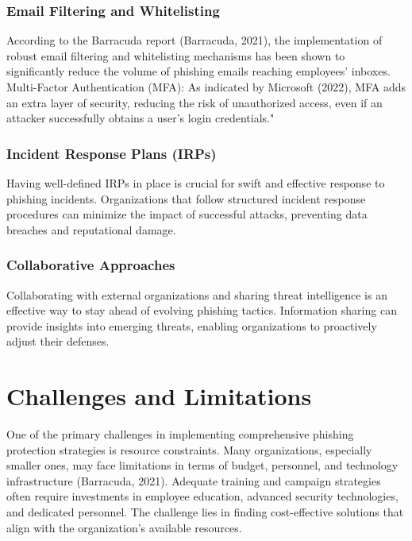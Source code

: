\documentclass[conference]{IEEEtran}
\begin{document}
\subsubsection{Email Filtering and Whitelisting} According to the Barracuda report (Barracuda, 2021), the implementation of robust email filtering and whitelisting mechanisms has been shown to significantly reduce the volume of phishing emails reaching employees' inboxes.
Multi-Factor Authentication (MFA): As indicated by Microsoft (2022), MFA adds an extra layer of security, reducing the risk of unauthorized access, even if an attacker successfully obtains a user's login credentials."

\subsubsection{Incident Response Plans (IRPs)} Having well-defined IRPs in place is crucial for swift and effective response to phishing incidents. Organizations that follow structured incident response procedures can minimize the impact of successful attacks, preventing data breaches and reputational damage.

\subsubsection{Collaborative Approaches} Collaborating with external organizations and sharing threat intelligence is an effective way to stay ahead of evolving phishing tactics. Information sharing can provide insights into emerging threats, enabling organizations to proactively adjust their defenses.


\section{Challenges and Limitations}
One of the primary challenges in implementing comprehensive phishing protection strategies is resource constraints. Many organizations, especially smaller ones, may face limitations in terms of budget, personnel, and technology infrastructure (Barracuda, 2021). Adequate training and campaign strategies often require investments in employee education, advanced security technologies, and dedicated personnel. The challenge lies in finding cost-effective solutions that align with the organization's available resources.
\end{document}
